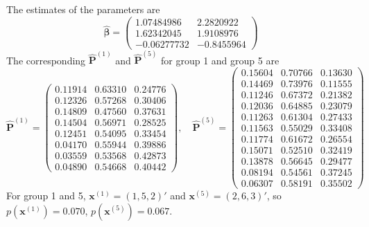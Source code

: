 \documentclass[12pt]{article}
\newcommand{\Pmat}{\mathbf{P}}
\newcommand{\wh}{\widehat}
\begin{document}
The estimates of the parameters are
\begin{equation*}
\wh{\boldsymbol{\beta}} =
\begin{pmatrix}
 1.07484986 & 2.2820922 \\
 1.62342045 & 1.9108976 \\
 -0.06277732 &-0.8455964
\end{pmatrix}
\end{equation*}
The corresponding $\wh{\Pmat}^{(1)}$ and $\wh{\Pmat}^{(5)}$ for group 1 and group 5 are
\begin{equation*}
    \wh{\Pmat}^{(1)} = \begin{pmatrix}

 0.11914 & 0.63310 & 0.24776\\
 0.12326 & 0.57268 & 0.30406\\
 0.14809 & 0.47560 & 0.37631\\
 0.14504 & 0.56971 & 0.28525\\
 0.12451 & 0.54095 & 0.33454\\
 0.04170 & 0.55944 & 0.39886\\
 0.03559 & 0.53568 & 0.42873\\
 0.04890 & 0.54668 & 0.40442
    \end{pmatrix}, \quad 
    \wh{\Pmat}^{(5)} = \begin{pmatrix}
 0.15604 & 0.70766 & 0.13630\\
 0.14469 & 0.73976 & 0.11555\\
 0.11246 & 0.67372 & 0.21382\\
 0.12036 & 0.64885 & 0.23079\\
 0.11263 & 0.61304 & 0.27433\\
 0.11563 & 0.55029 & 0.33408\\
 0.11774 & 0.61672 & 0.26554\\
 0.15071 & 0.52510 & 0.32419\\
 0.13878 & 0.56645 & 0.29477\\
 0.08194 & 0.54561 & 0.37245\\
 0.06307 & 0.58191 & 0.35502
    \end{pmatrix}
\end{equation*}
For group 1 and 5, $\boldsymbol{x}^{(1)} = (1,5,2)'$ and $\boldsymbol{x}^{(5)} = (2,6,3)'$, so $p(\boldsymbol{x}^{(1)}) = 0.070$, $p(\boldsymbol{x}^{(5)}) = 0.067$.

\end{document}
